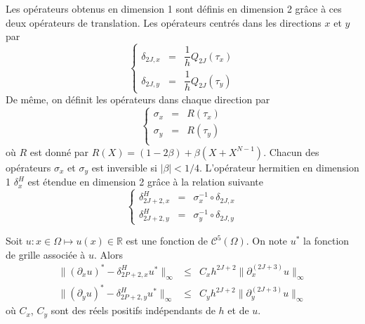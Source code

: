 Les opérateurs obtenus en dimension 1 sont définis en dimension 2 grâce à ces deux opérateurs de translation. Les opérateurs centrés dans les directions $x$ et $y$ par 
\begin{equation}
\left\lbrace
\begin{array}{rcl}
\delta_{2J,x} & = & \dfrac{1}{h} Q_{2J}(\tau_x) \\
\delta_{2J,y} & = & \dfrac{1}{h} Q_{2J}(\tau_y)
\end{array}
\right.
\label{eq:der_centrée_2D}
\end{equation}
De même, on définit les opérateurs dans chaque direction par 
\begin{equation}
\left\lbrace
\begin{array}{rcl}
\sigma_x & = & R(\tau_x) \\
\sigma_y & = & R(\tau_y) \\
\end{array}
\right.
\label{eq:simpson_2D}
\end{equation}
où $R$ est donné par $R(X) = (1-2 \beta) + \beta (X+X^{N-1})$.
Chacun des opérateurs $\sigma_x$ et $\sigma_y$ est inversible si $|\beta|<1/4$.
L'opérateur hermitien en dimension 1 $\delta_x^H$ est étendue en dimension 2 grâce à la relation suivante 
\begin{equation}
\left\lbrace
\begin{array}{rcl}
\delta_{2J+2,x}^H & = & \sigma_x^{-1} \circ \delta_{2J,x} \\
\delta_{2J+2,y}^H & = & \sigma_y^{-1} \circ \delta_{2J,y}
\end{array}
\right.
\label{eq:der_herm_2D}
\end{equation}

\begin{theoreme}
Soit $u : x \in \Omega \mapsto u(x) \in \mathbb{R}$ est une fonction de $\mathcal{C}^5 (\Omega)$. On note $u^*$ la fonction de grille associée à $u$. Alors
\begin{equation}
\begin{array}{rcl}
\|(\partial_x u)^* - \delta_{2P+2,x}^H u^*\|_{\infty} & \leq & C_x h^{2J+2} \| \partial_x^{(2J+3)}u \|_{\infty}\\
\|(\partial_y u)^* - \delta_{2P+2,y}^H u^*\|_{\infty} &\leq & C_y h^{2J+2} \| \partial_y^{(2J+3)}u \|_{\infty}
\end{array}
\end{equation}
où $C_x$, $C_y$ sont des réels positifs indépendants de $h$ et de $u$.
\end{theoreme}

